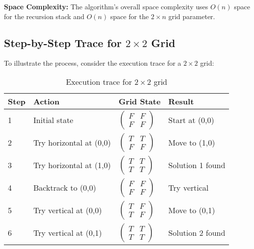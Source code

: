 \documentclass[conference]{IEEEtran}
\begin{document}
\textbf{Space Complexity:} The algorithm's overall space complexity uses $O(n)$ space for the recursion stack and $O(n)$ space for the $2 \times n$ grid parameter.

\subsection{Step-by-Step Trace for $2 \times 2$ Grid}

To illustrate the process, consider the execution trace for a $2 \times 2$ grid:

\begin{table}[htbp]
\centering
\caption{Execution trace for $2 \times 2$ grid}
\label{tab:trace}
\renewcommand{\arraystretch}{2.0} %
\begin{tabular}{|p{0.7cm}|p{2.2cm}|p{1.8cm}|p{2.0cm}|}
\hline
\textbf{Step} & \textbf{Action} & \textbf{Grid State} & \textbf{Result} \\
\hline
1 & Initial state & $\begin{pmatrix} F & F \\ F & F \end{pmatrix}$ & Start at (0,0) \\
\hline
2 & Try horizontal at (0,0) & $\begin{pmatrix} T & T \\ F & F \end{pmatrix}$ & Move to (1,0) \\
\hline
3 & Try horizontal at (1,0) & $\begin{pmatrix} T & T \\ T & T \end{pmatrix}$ & Solution 1 found \\
\hline
4 & Backtrack to (0,0) & $\begin{pmatrix} F & F \\ F & F \end{pmatrix}$ & Try vertical \\
\hline
5 & Try vertical at (0,0) & $\begin{pmatrix} T & F \\ T & F \end{pmatrix}$ & Move to (0,1) \\
\hline
6 & Try vertical at (0,1) & $\begin{pmatrix} T & T \\ T & T \end{pmatrix}$ & Solution 2 found \\
\hline
\end{tabular}
\end{table}
\end{document}
